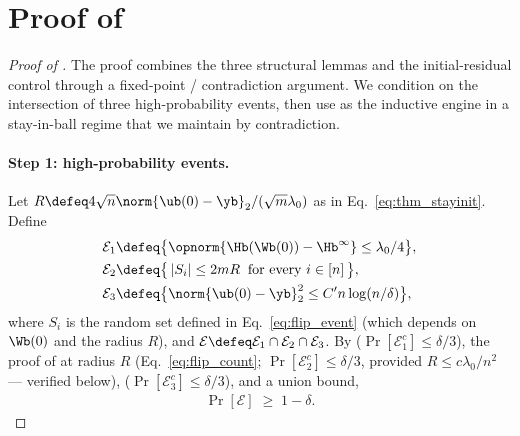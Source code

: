\section{Proof of \texorpdfstring{}{the main theorem}}\label{sec:proof_main}

\begin{proof}[Proof of ]
The proof combines the three structural lemmas  and the initial-residual control  through a fixed-point / contradiction argument. We condition on the intersection of three high-probability events, then use  as the inductive engine in a stay-in-ball regime that we maintain by contradiction.

\paragraph{Step 1: high-probability events.}
Let $R \defeq 4 \sqrt n \norm{\ub(0) - \yb}_2 / (\sqrt m \lambda_0)$ as in Eq.~\eqref{eq:thm_stayinit}. Define
\begin{align*}
\mathcal E_1 &\defeq \big\{ \opnorm{\Hb(\Wb(0)) - \Hb^\infty} \le \lambda_0/4 \big\}, \\
\mathcal E_2 &\defeq \big\{ \, |S_i| \le 2 m R \;\; \text{for every } i \in [n] \, \big\}, \\
\mathcal E_3 &\defeq \big\{ \norm{\ub(0) - \yb}_2^2 \le C' n \log(n/\delta) \big\},
\end{align*}
where $S_i$ is the random set defined in Eq.~\eqref{eq:flip_event} (which depends on $\Wb(0)$ and the radius $R$), and $\mathcal E \defeq \mathcal E_1 \cap \mathcal E_2 \cap \mathcal E_3$. By  ($\Pr[\mathcal E_1^c] \le \delta/3$), the proof of  at radius $R$ (Eq.~\eqref{eq:flip_count}; $\Pr[\mathcal E_2^c] \le \delta/3$, provided $R \le c \lambda_0 / n^2$ — verified below),  ($\Pr[\mathcal E_3^c] \le \delta/3$), and a union bound,
\begin{align*}
\Pr[\mathcal E] \;\ge\; 1 - \delta.
\end{align*}


\end{proof}
